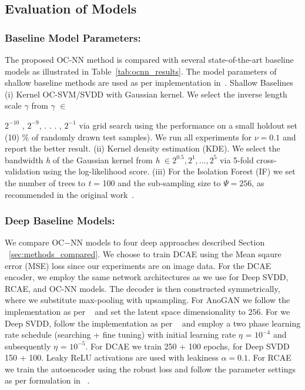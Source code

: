 \subsection{Evaluation of Models}
\label{sec:evaluationOfModels}
\subsubsection{\textbf{Baseline Model Parameters:}}
\label{sec:baselinemodel_parameters.}
The proposed OC-NN method is compared with several state-of-the-art baseline models as illustrated in Table~\ref{tab:ocnn_results}. The model parameters of shallow baseline methods are used as per implementation in~\cite{pmlrv80ruff18a}. Shallow Baselines (i) Kernel OC-SVM/SVDD with
Gaussian kernel. We select the inverse length scale $\gamma$ from
$\gamma$  $\in$ {$2^{ - 10}$ , $2^{ - 9}$, . . . , $2^{ - 1}$ via grid search using the performance on a small holdout set (10) \% of randomly drawn test samples). We run all experiments for $\nu = 0.1$ and report the better result. (ii) Kernel density estimation (KDE). We select the bandwidth \textit{h} of the Gaussian kernel from \textit{h} $ \in {2^{0.5} , 2 ^1, . . . , 2^5}$ via 5-fold cross-validation using  the log-likelihood score. (iii) For the  Isolation Forest (IF) we set the number of trees to \textit{t} = 100 and the sub-sampling size to $\Psi = 256$, as recommended in the original work~\cite{pmlrv80ruff18a}.
\vspace{-0.4cm}
\subsubsection{ \textbf{Deep Baseline Models:}}
We compare OC$-$NN models to  four deep approaches described Section ~\ref{sec:methods_compared}.
We choose to train DCAE using the Mean sqaure error (MSE) loss since our experiments are on image data. For the DCAE encoder, we employ the same network architectures as we use for Deep SVDD, RCAE, and OC-NN models. The decoder is then constructed symmetrically, where we substitute max-pooling with upsampling. For AnoGAN we follow the implementation as per ~\cite{radford2015unsupervised} and set
the latent space dimensionality to $256$.
For we Deep SVDD, follow the implementation as per ~\cite{pmlrv80ruff18a} and employ a  two phase learning rate schedule (searching + fine tuning) with initial learning rate $\eta$ = $10^{ - 4}$  and subsequently $\eta$ = $10^{ - 5}$. For DCAE we train 250 + 100 epochs, for Deep SVDD 150 + 100. Leaky ReLU activations are used with leakiness $\alpha=0.1$. For RCAE we train the autoencoder using the robust loss and follow the parameter settings as per formulation in ~\cite{chalapathy2017robust}.

}
